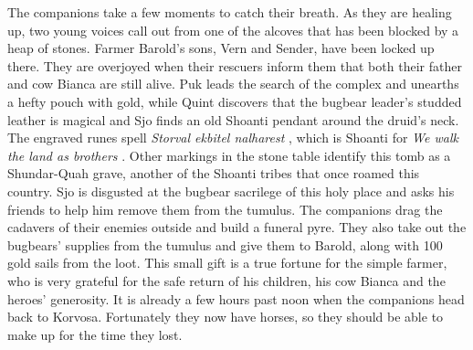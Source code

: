 The companions take a few moments to catch their breath. As they are healing up, two young voices call out from one of the alcoves that has been blocked by a heap of stones. Farmer Barold's sons, Vern and Sender, have been locked up there. They are overjoyed when their rescuers inform them that both their father and cow Bianca are still alive. Puk leads the search of the complex and unearths a hefty pouch with gold, while Quint discovers that the bugbear leader's studded leather is magical and Sjo finds an old Shoanti pendant around the druid's neck. The engraved runes spell {\itshape Storval ekbitel nalharest} , which is Shoanti for  {\itshape We walk the land as brothers} . Other markings in the stone table identify this tomb as a Shundar-Quah grave, another of the Shoanti tribes that once roamed this country. Sjo is disgusted at the bugbear sacrilege of this holy place and asks his friends to help him remove them from the tumulus. The companions drag the cadavers of their enemies outside and build a funeral pyre. They also take out the bugbears' supplies from the tumulus and give them to Barold, along with 100 gold sails from the loot. This small gift is a true fortune for the simple farmer, who is very grateful for the safe return of his children, his cow Bianca and the heroes' generosity. It is already a few hours past noon when the companions head back to Korvosa. Fortunately they now have horses, so they should be able to make up for the time they lost.\\

